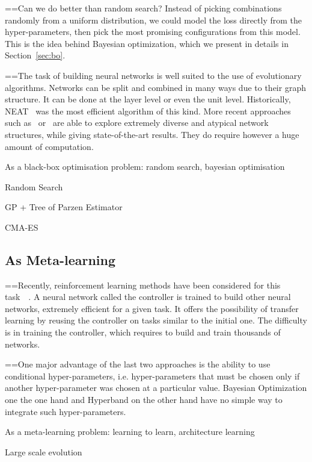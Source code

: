 ==Can we do better than random search? Instead of picking combinations randomly from a uniform distribution, we could model the loss directly from the hyper-parameters, then pick the most promising configurations from this model. This is the idea behind Bayesian optimization, which we present in details in Section~\ref{sec:bo}.

==The task of building neural networks is well suited to the use of evolutionary algorithms. Networks can be split and combined in many ways due to their graph structure. It can be done at the layer level or even the unit level. Historically, NEAT~\cite{stanley2002EC} was the most efficient algorithm of this kind. More recent approaches such as~\cite{real2017ICML} or~\cite{miikkulainen2017} are able to explore extremely diverse and atypical network structures, while giving state-of-the-art results. They do require however a huge amount of computation.


As a black-box optimisation problem: random search, bayesian optimisation

Random Search~\textcite{bergstra2012JMLR}

GP + Tree of Parzen Estimator~\textcite{bergstra2011NIPS}

CMA-ES

\subsection{As Meta-learning}

==Recently, reinforcement learning methods have been considered for this task~\cite{baker2017ICLR}~\cite{zoph2017ICLR}. A neural network called the controller is trained to build other neural networks, extremely efficient for a given task. It offers the possibility of transfer learning by reusing the controller on tasks similar to the initial one. The difficulty is in training the controller, which requires to build and train thousands of networks. 

==One major advantage of the last two approaches is the ability to use conditional hyper-parameters, i.e. hyper-parameters that must be chosen only if another hyper-parameter was chosen at a particular value. Bayesian Optimization one the one hand and Hyperband on the other hand have no simple way to integrate such hyper-parameters.

As a meta-learning problem: learning to learn, architecture learning

Large scale evolution

